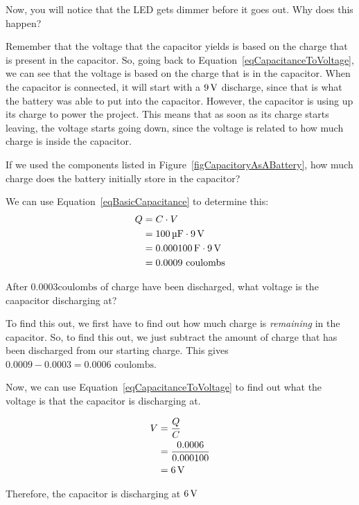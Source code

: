 Now, you will notice that the LED gets dimmer before it goes out.  
Why does this happen?

Remember that the voltage that the capacitor yields is based on the charge that is present in the capacitor.
So, going back to Equation~\ref{eqCapacitanceToVoltage}, we can see that the voltage is based on the charge that is in the capacitor.
When the capacitor is connected, it will start with a $9\,\si{\volt}$ discharge, since that is what the battery was able to put into the capacitor.
However, the capacitor is using up its charge to power the project.
This means that as soon as its charge starts leaving, the voltage starts going down, since the voltage is related to how much charge is inside the capacitor.

\begin{exampleprob}
If we used the components listed in Figure~\ref{figCapacitoryAsABattery}, how much charge does the battery initially store in the capacitor?

We can use Equation~\ref{eqBasicCapacitance} to determine this:
\begin{align*}
Q &= C\cdot V \\
  &= 100\,\si{\micro\farad}\cdot 9\,\si{\volt} \\
  &= 0.000100\,\si{\farad}\cdot 9\,\si{\volt} \\
  &= 0.0009 \textrm{ coulombs}
\end{align*}
\end{exampleprob}

\begin{exampleprob}
After $0.0003 \textrm{coulombs}$ of charge have been discharged, what voltage is the caapacitor discharging at?

To find this out, we first have to find out how much charge is \emph{remaining} in the capacitor.  
So, to find this out, we just subtract the amount of charge that has been discharged from our starting charge.
This gives $0.0009 - 0.0003 = 0.0006 \textrm{ coulombs}$.

Now, we can use Equation~\ref{eqCapacitanceToVoltage} to find out what the voltage is that the capacitor is discharging at.

\begin{align*}
V &= \frac{Q}{C} \\
  &= \frac{0.0006}{0.000100} \\
  &= 6\,\si{\volt}
\end{align*}

Therefore, the capacitor is discharging at $6\,\si{\volt}$
\end{exampleprob}

